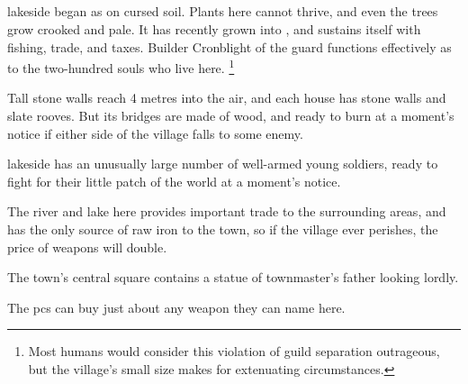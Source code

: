 

\subsection{}
\label{lakeside}

\Gls{lakeside} began as  on cursed soil.
Plants here cannot thrive, and even the trees grow crooked and pale.
It has recently grown into , and sustains itself with fishing, trade, and taxes.
Builder Cronblight of the \gls{guard} functions effectively as  to the two-hundred souls who live here.%
\footnote{Most humans would consider this violation of guild separation outrageous, but the \gls{village}'s small size makes for extenuating circumstances.}

Tall stone walls reach 4 metres into the air, and each house has stone walls and slate rooves.
But its bridges are made of wood, and ready to burn at a moment's notice if either side of the \gls{village} falls to some enemy.

\Gls{lakeside} has an unusually large number of well-armed young soldiers, ready to fight for their little patch of the world at a moment's notice.

The river and lake here provides important trade to the surrounding areas, and has the only source of raw iron to the town, so if the \gls{village} ever perishes, the price of weapons will double.

\label{cronblight}



The town's central square contains a statue of \gls{townmaster}'s father looking lordly.


The \glspl{pc} can buy just about any weapon they can name here.

